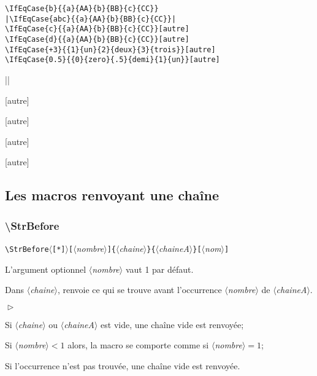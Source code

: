 \documentclass[a4paper,10pt]{article}
\newcommand\argu[1]{$\langle$\textit{#1}$\rangle$}
\newcommand\ARGU[1]{\texttt{\color{black}\{}\argu{#1}\texttt{\color{black}\}}}
\newcommand\arguC[1]{\texttt{\color{black}[}\argu{#1}\texttt{\color{black}]}}
\newcommand\etoile{$\langle$\texttt{[*]}$\rangle$}
\newenvironment{Conditions}[1][1cm]%
{\begin{list}%
	{$\vartriangleright$}%
	{\setlength{\leftmargin}{#1}
	 \setlength{\itemsep}{0pt}
	 \setlength{\parsep}{0pt}
	 \setlength{\topsep}{2ptplus3ptminus2pt}
	}}%
{\end{list}}
\newcommand\styleexemple{\small\vskip4pt}
\newcommand\verbinline{\lstinline[basicstyle=\normalsize\ttfamily]}
\begin{document}
\begin{minipage}[t]{0.65\linewidth}
\begin{lstlisting}
\IfEqCase{b}{{a}{AA}{b}{BB}{c}{CC}}
|\IfEqCase{abc}{{a}{AA}{b}{BB}{c}{CC}}|
\IfEqCase{c}{{a}{AA}{b}{BB}{c}{CC}}[autre]
\IfEqCase{d}{{a}{AA}{b}{BB}{c}{CC}}[autre]
\IfEqCase{+3}{{1}{un}{2}{deux}{3}{trois}}[autre]
\IfEqCase{0.5}{{0}{zero}{.5}{demi}{1}{un}}[autre]
\end{lstlisting}%
\end{minipage}\hfill
\begin{minipage}[t]{0.35\linewidth}
	\styleexemple
	\par
	||\par
	[autre]\par
	[autre]\par
	[autre]\par
	[autre]
\end{minipage}%

\subsection{Les macros renvoyant une chaîne}
\subsubsection{\ttfamily\textbackslash StrBefore}
\verbinline|\StrBefore|\etoile\arguC{nombre}\ARGU{chaine}\ARGU{chaineA}\arguC{nom}
\smallskip

L'argument optionnel \argu{nombre} vaut 1 par défaut.\par\nobreak\smallskip
Dans \argu{chaine}, renvoie ce qui se trouve avant l'occurrence \no\argu{nombre} de \argu{chaineA}.\medskip

\begin{Conditions}
	\item Si \argu{chaine} ou \argu{chaineA} est vide, une chaîne vide est renvoyée;
	\item Si \argu{nombre}${}<1$ alors, la macro se comporte comme si \argu{nombre}${}=1$;
	\item Si l'occurrence n'est pas trouvée, une chaîne vide est renvoyée.
\end{Conditions}
\end{document}
